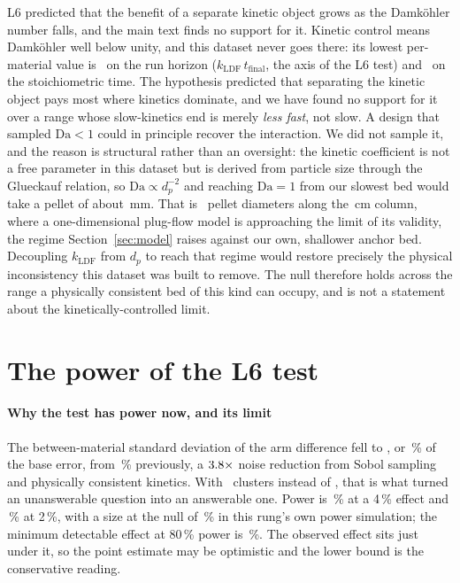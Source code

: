 L6 predicted that the benefit of a separate kinetic object grows as the Damk\"ohler
number falls, and the main text finds no support for it. Kinetic control means Damk\"ohler well below unity, and this dataset never
goes there: its lowest per-material value is \nDaMatMin\ on the run horizon (\(k_{\mathrm{LDF}}\,t_{\mathrm{final}}\), the axis of the L6 test) and \nDaStMin\ on the stoichiometric time. The hypothesis predicted
that separating the kinetic object pays most where kinetics dominate, and we have
found no support for it over a range whose slow-kinetics end is merely \emph{less fast}, not
slow. A design that sampled \(\mathrm{Da} < 1\) could in principle recover the
interaction. We did not sample it, and the reason is structural rather than an
oversight: the kinetic coefficient is not a free parameter in this dataset but is
derived from particle size through the Glueckauf relation, so
\(\mathrm{Da} \propto d_p^{-2}\) and reaching \(\mathrm{Da} = 1\) from our slowest
bed would take a pellet of about \nDaPelletForUnity\,\si{\milli\metre}. That is
\nDaPelletsAcross\ pellet diameters along the \nDataBedLenCm\,\si{\centi\metre} column, where a
one-dimensional plug-flow model is approaching the limit of its validity, the regime
Section~\ref{sec:model} raises against our own, shallower anchor bed. Decoupling
\(k_{\mathrm{LDF}}\) from \(d_p\) to reach that regime would restore precisely the
physical inconsistency this dataset was built to remove. The null therefore
holds across the range a physically consistent bed of this kind can occupy, and is
not a statement about the kinetically-controlled limit.

\section{The power of the L6 test}
\label{s2:sec6}

\paragraph{Why the test has power now, and its limit} The between-material standard
deviation of the arm difference fell to \nLsixBetweenSD, or
\nLsixBetweenOverBase\,\% of the base error, from \nLsixLegacyBetweenOverBase\,\% previously, a \(3.8\times\) noise reduction from Sobol sampling and physically consistent
kinetics. With \nNclustFolds\ clusters instead of \nNclustLegacy, that is what turned an unanswerable
question into an answerable one. Power is \nLsixPowerFour\,\% at a 4\,\% effect and
\nLsixPowerTwo\,\% at 2\,\%, with a size at the null of \nLsixSizeNull\,\% in this rung's own power simulation; the minimum
detectable effect at 80\,\% power is \nLsixMDE\,\%. The observed effect sits just
under it, so the point estimate may be optimistic and the lower bound is the
conservative reading.

